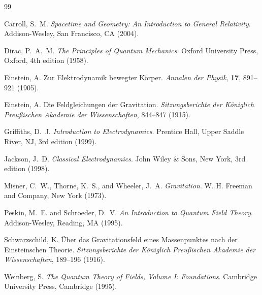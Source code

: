 \begin{thebibliography}{99}
	
	Carroll, S.~M.
	\newblock \textit{Spacetime and Geometry: An Introduction to General Relativity}.
	\newblock Addison-Wesley, San Francisco, CA (2004).
	
	Dirac, P.~A.~M.
	\newblock \textit{The Principles of Quantum Mechanics}.
	\newblock Oxford University Press, Oxford, 4th edition (1958).
	
	Einstein, A.
	\newblock Zur Elektrodynamik bewegter Körper.
	\newblock \textit{Annalen der Physik}, \textbf{17}, 891--921 (1905).
	
	Einstein, A.
	\newblock Die Feldgleichungen der Gravitation.
	\newblock \textit{Sitzungsberichte der Königlich Preußischen Akademie der Wissenschaften}, 844--847 (1915).
	
	Griffiths, D.~J.
	\newblock \textit{Introduction to Electrodynamics}.
	\newblock Prentice Hall, Upper Saddle River, NJ, 3rd edition (1999).
	
	Jackson, J.~D.
	\newblock \textit{Classical Electrodynamics}.
	\newblock John Wiley \& Sons, New York, 3rd edition (1998).
	
	Misner, C.~W., Thorne, K.~S., and Wheeler, J.~A.
	\newblock \textit{Gravitation}.
	\newblock W. H. Freeman and Company, New York (1973).
	
	Peskin, M.~E. and Schroeder, D.~V.
	\newblock \textit{An Introduction to Quantum Field Theory}.
	\newblock Addison-Wesley, Reading, MA (1995).
	
	Schwarzschild, K.
	\newblock Über das Gravitationsfeld eines Massenpunktes nach der Einsteinschen Theorie.
	\newblock \textit{Sitzungsberichte der Königlich Preußischen Akademie der Wissenschaften}, 189--196 (1916).
	
	Weinberg, S.
	\newblock \textit{The Quantum Theory of Fields, Volume I: Foundations}.
	\newblock Cambridge University Press, Cambridge (1995).
	
\end{thebibliography}